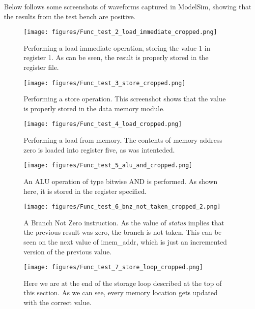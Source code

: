 \documentclass[11pt]{article}
\begin{document}
Below follows some screenshots of waveforms captured in ModelSim,
showing that the results from the test bench are positive.

\begin{figure}[ht]
  \centering
  \texttt{[image: figures/Func\_test\_2\_load\_immediate\_cropped.png]}
  \caption{\label{fig:ldi} Performing a load immediate operation,
    storing the value 1 in register 1. As can be seen, the result is
    properly stored in the register file.}
\end{figure}

\begin{figure}[ht]
  \centering
  \texttt{[image: figures/Func\_test\_3\_store\_cropped.png]}
  \caption{\label{fig:ldi} Performing a store operation. This
    screenshot shows that the value is properly stored in the data
    memory module.}
\end{figure}

\begin{figure}[ht]
  \centering
  \texttt{[image: figures/Func\_test\_4\_load\_cropped.png]}
  \caption{\label{fig:ldi} Performing a load from memory. The contents
    of memory address zero is loaded into register five, as was
    intenteded.}
\end{figure}

\begin{figure}[ht]
  \centering
  \texttt{[image: figures/Func\_test\_5\_alu\_and\_cropped.png]}
  \caption{\label{fig:ldi} An ALU operation of type bitwise AND is
    performed. As shown here, it is stored in the register specified.}
\end{figure}

\begin{figure}[ht]
  \centering
  \texttt{[image: figures/Func\_test\_6\_bnz\_not\_taken\_cropped\_2.png]}
  \caption{\label{fig:ldi} A Branch Not Zero instruction. As the value
    of {\em status} implies that the previous result was zero, the
    branch is not taken. This can be seen on the next value of
    imem\_addr, which is just an incremented version of the previous
    value.}
\end{figure}

\begin{figure}[ht]
  \centering
  \texttt{[image: figures/Func\_test\_7\_store\_loop\_cropped.png]}
  \caption{\label{fig:ldi} Here we are at the end of the storage loop
    described at the top of this section. As we can see, every memory
    location gets updated with the correct value.}
\end{figure}
\end{document}
